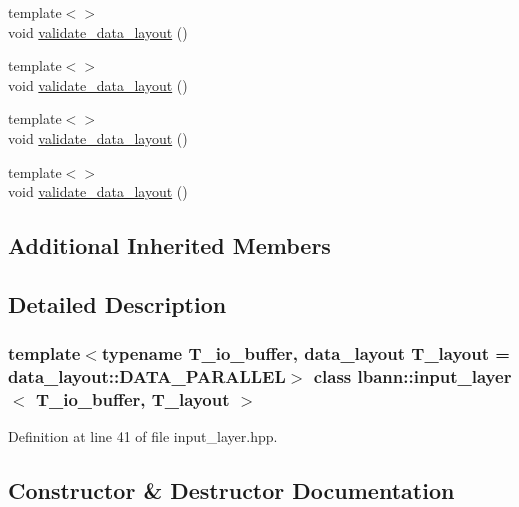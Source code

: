 \begin{DoxyCompactItemize}
\item 
{\footnotesize template$<$$>$ }\\void \hyperlink{classlbann_1_1input__layer_a002a1f299fd8e63c13c4e27a61e86d61}{validate\+\_\+data\+\_\+layout} ()
\item 
{\footnotesize template$<$$>$ }\\void \hyperlink{classlbann_1_1input__layer_a129f797705ae7584d6bc612b15aeb294}{validate\+\_\+data\+\_\+layout} ()
\item 
{\footnotesize template$<$$>$ }\\void \hyperlink{classlbann_1_1input__layer_a4335c1d23efe251f7d7164d907a11d65}{validate\+\_\+data\+\_\+layout} ()
\item 
{\footnotesize template$<$$>$ }\\void \hyperlink{classlbann_1_1input__layer_a26ae8f3e7a583bda6ead168b2be77fa1}{validate\+\_\+data\+\_\+layout} ()
\end{DoxyCompactItemize}
\subsection*{Additional Inherited Members}


\subsection{Detailed Description}
\subsubsection*{template$<$typename T\+\_\+io\+\_\+buffer, data\+\_\+layout T\+\_\+layout = data\+\_\+layout\+::\+D\+A\+T\+A\+\_\+\+P\+A\+R\+A\+L\+L\+EL$>$\newline
class lbann\+::input\+\_\+layer$<$ T\+\_\+io\+\_\+buffer, T\+\_\+layout $>$}



Definition at line 41 of file input\+\_\+layer.\+hpp.



\subsection{Constructor \& Destructor Documentation}
\mbox{\label{classlbann_1_1input__layer_aad8b042899d86f5b7904d9d2653b5181}} 
